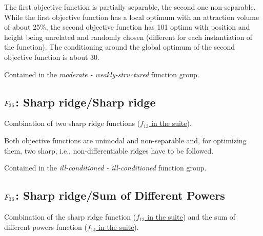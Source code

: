 The first objective function is partially separable, the second one
non-separable. While the first objective function has a local optimum
with an attraction volume of about 25\%, the second objective function
has 101 optima with position and height being unrelated and randomly
chosen (different for each instantiation of the function). The
conditioning around the global optimum of the second objective function
is about 30.

Contained in the \emph{moderate - weakly-structured} function group.



\subsection[\texorpdfstring{\protect\(F_{35}\protect\): Sharp ridge/Sharp ridge}{F35: Sharp ridge/Sharp ridge}]{\texorpdfstring{\protect\(F_{35}\protect\): Sharp ridge/Sharp ridge}{}}
\label{index:sharp-ridge-sharp-ridge}\label{index:f35}
Combination of two sharp ridge functions (\href{https://coco.gforge.inria.fr/downloads/download16.00/bbobdocfunctions.pdf\#page=65}{\(f_{13}\) in the \bbob suite}).

Both objective functions are unimodal and non-separable and, for
optimizing them, two sharp, i.e., non-differentiable ridges have to be
followed.

Contained in the \emph{ill-conditioned - ill-conditioned} function group.



\subsection[\texorpdfstring{\protect\(F_{36}\protect\): Sharp ridge/Sum of Different Powers}{F36: Sharp ridge/Sum of Different Powers}]{\texorpdfstring{\protect\(F_{36}\protect\): Sharp ridge/Sum of Different Powers}{}}
\label{index:sharp-ridge-sum-of-different-powers}\label{index:f36}
Combination of the sharp ridge function (\href{https://coco.gforge.inria.fr/downloads/download16.00/bbobdocfunctions.pdf\#page=65}{\(f_{13}\) in the \bbob suite}) and the
sum of different powers function
(\href{https://coco.gforge.inria.fr/downloads/download16.00/bbobdocfunctions.pdf\#page=70}{\(f_{14}\) in the \bbob suite}).

